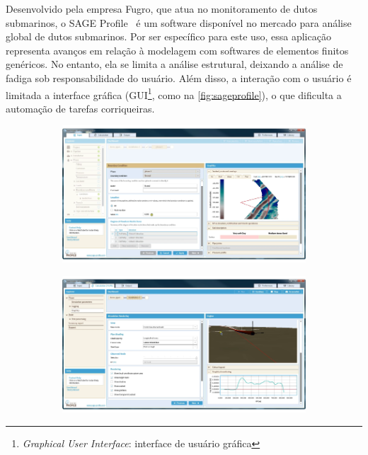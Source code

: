 

Desenvolvido pela empresa Fugro, que atua no monitoramento de dutos submarinos, o SAGE Profile~\cite{sageprofile} é um software disponível no mercado para análise global de dutos submarinos. Por ser específico para este uso, essa aplicação representa avanços em relação à modelagem com softwares de elementos finitos genéricos.
No entanto, ela se limita a análise estrutural, deixando a análise de fadiga sob responsabilidade do usuário. Além disso, a interação com o usuário é limitada a interface gráfica (GUI\footnote{\textit{Graphical User Interface}: interface de usuário gráfica}, como na \autoref{fig:sageprofile}), o que dificulta a automação de tarefas corriqueiras.

\begin{figure}[!ht]
    \centering
    \caption{Interface gráfica do SAGE Profile.}\label{fig:sageprofile}
    \begin{subfigure}[t]{0.49\textwidth}
        \centering
        \includegraphics[width=\textwidth]{imagens/sage_profile_1}
    \end{subfigure}
    \hfill
    \begin{subfigure}[t]{0.49\textwidth}
        \centering
        \includegraphics[width=\textwidth]{imagens/sage_profile_2}
    \end{subfigure}
\end{figure}


